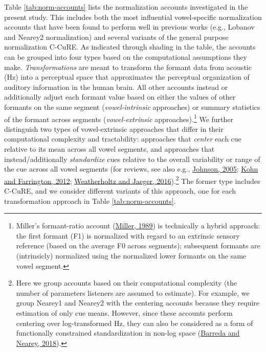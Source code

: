\documentclass[utf8]{frontiersSCNS}
\begin{document}
Table \ref{tab:norm-accounts} lists the normalization accounts investigated in the present study. This includes both the most influential vowel-specific normalization accounts that have been found to perform well in previous works (e.g., Lobanov and Nearey2 normalization) and several variants of the general purpose normalization C-CuRE. As indicated through shading in the table, the accounts can be grouped into four types based on the computational assumptions they make. \emph{Transformations} are meant to transform the formant data from acoustic (Hz) into a perceptual space that approximates the perceptual organization of auditory information in the human brain. All other accounts instead or additionally adjust each formant value based on either the values of other formants on the same segment (\emph{vowel-intrinsic} approaches) or summary statistics of the formant across segments (\emph{vowel-extrinsic} approaches).\footnote{Miller's formant-ratio account (\protect\hyperlink{ref-miller1989c}{Miller, 1989}) is technically a hybrid approach: the first formant (F1) is normalized with regard to an extrinsic sensory reference (based on the average F0 across segments); subsequent formants are (intrinsicly) normalized using the normalized lower formants on the same vowel segment.} We further distinguish two types of vowel-extrinsic approaches that differ in their computational complexity and tractability: approaches that \emph{center} each cue relative to its mean across all vowel segments, and approaches that instead/additionally \emph{standardize} cues relative to the overall variability or range of the cue across all vowel segments (for reviews, see also e.g., \protect\hyperlink{ref-Johnson2005c}{Johnson, 2005}; \protect\hyperlink{ref-kohn2012a}{Kohn and Farrington, 2012}; \protect\hyperlink{ref-weatherholtz-jaeger2016}{Weatherholtz and Jaeger, 2016}).\footnote{Here we group accounts based on their computational complexity (the number of parameters listeners are assumed to estimate). For example, we group Nearey1 and Nearey2 with the centering accounts because they require estimation of only cue means. However, since these accounts perform centering over log-transformed Hz, they can also be considered as a form of functionally constrained standardization in non-log space (\protect\hyperlink{ref-barreda2018a}{Barreda and Nearey, 2018}).} The former type includes C-CuRE, and we consider different variants of this approach, one for each transformation approach in Table \ref{tab:norm-accounts}.
\end{document}
